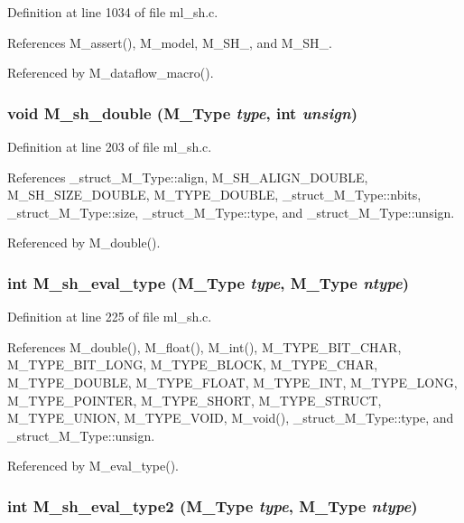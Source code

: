 Definition at line 1034 of file ml\_\-sh.c.

References M\_\-assert(), M\_\-model, M\_\-SH\_, and M\_\-SH\_.

Referenced by M\_\-dataflow\_\-macro().
\subsubsection{\setlength{\rightskip}{0pt plus 5cm}void M\_\-sh\_\-double (\bf{M\_\-Type} {\em type}, int {\em unsign})}\label{m__sh_8h_7059b5e28cecb9852fc8d0798301f6f2}




Definition at line 203 of file ml\_\-sh.c.

References \_\-struct\_\-M\_\-Type::align, M\_\-SH\_\-ALIGN\_\-DOUBLE, M\_\-SH\_\-SIZE\_\-DOUBLE, M\_\-TYPE\_\-DOUBLE, \_\-struct\_\-M\_\-Type::nbits, \_\-struct\_\-M\_\-Type::size, \_\-struct\_\-M\_\-Type::type, and \_\-struct\_\-M\_\-Type::unsign.

Referenced by M\_\-double().
\subsubsection{\setlength{\rightskip}{0pt plus 5cm}int M\_\-sh\_\-eval\_\-type (\bf{M\_\-Type} {\em type}, \bf{M\_\-Type} {\em ntype})}\label{m__sh_8h_7b4b1a2e3ff0183b6f5a8d2187bf9472}




Definition at line 225 of file ml\_\-sh.c.

References M\_\-double(), M\_\-float(), M\_\-int(), M\_\-TYPE\_\-BIT\_\-CHAR, M\_\-TYPE\_\-BIT\_\-LONG, M\_\-TYPE\_\-BLOCK, M\_\-TYPE\_\-CHAR, M\_\-TYPE\_\-DOUBLE, M\_\-TYPE\_\-FLOAT, M\_\-TYPE\_\-INT, M\_\-TYPE\_\-LONG, M\_\-TYPE\_\-POINTER, M\_\-TYPE\_\-SHORT, M\_\-TYPE\_\-STRUCT, M\_\-TYPE\_\-UNION, M\_\-TYPE\_\-VOID, M\_\-void(), \_\-struct\_\-M\_\-Type::type, and \_\-struct\_\-M\_\-Type::unsign.

Referenced by M\_\-eval\_\-type().
\subsubsection{\setlength{\rightskip}{0pt plus 5cm}int M\_\-sh\_\-eval\_\-type2 (\bf{M\_\-Type} {\em type}, \bf{M\_\-Type} {\em ntype})}\label{m__sh_8h_c19e498e738a8bb5e303fd567644a243}




